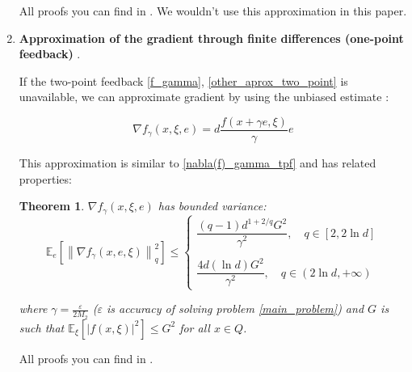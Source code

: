 \documentclass{article}
\newtheorem{theorem}{Theorem}
\begin{document}
\begin{enumerate}
            All proofs you can find in \cite{nemirovskij1983problem}. We wouldn't use this approximation in this paper.
    
            \item \textbf{Approximation of the gradient through finite differences (one-point feedback)} \cite{gasnikov2017stochastic, nemirovskij1983problem}.
    
            If the two-point feedback \eqref{f_gamma}, \eqref{other_aprox_two_point} is unavailable, we can approximate gradient by using the unbiased estimate \cite{Randomized_gradient_free_methods_in_convex_optimization, gasnikov2017stochastic}:
            
            \begin{equation}
                \label{nabla(f)_gamma_opf}
                \nabla f_{\gamma}(x, \xi, e) = d \dfrac{f(x+\gamma e, \xi)}{\gamma}e
            \end{equation}
    
            This approximation is similar to \eqref{nabla(f)_gamma_tpf} and has related properties:
    
            \begin{theorem} \label{th_2}
                $\nabla f_{\gamma}(x, \xi, e)$ has bounded variance:
                \begin{equation}
                    \label{prop_nabla_f_g_opf}
                    \mathbb{E}_e\left[\left\| \nabla f_{\gamma}(x, e, \xi) \right\|_q^2\right] \leq 
                    \left\{\begin{array}{l}
                         \dfrac{(q-1)d^{1 + 2/q}G^2}{\gamma^2}, \quad q \in \left[2, 2 \ln d\right] \\
                         \\
                         \dfrac{4d(\ln d)G^2}{\gamma^2}, \quad q \in (2 \ln d, +\infty)
                    \end{array}\right.
                \end{equation}
    
                where $\gamma = \frac{\varepsilon}{2 M_2}$ ($\varepsilon$ is accuracy of solving problem \eqref{main_problem}) and $G$ is such that $\mathbb{E}_{\xi}\left[|f(x, \xi)|^2\right] \leq G^2$ for all $x \in Q$.
            \end{theorem}
    
            All proofs you can find in \cite{gasnikov2017stochastic}.
          
        \end{enumerate}
\end{document}
